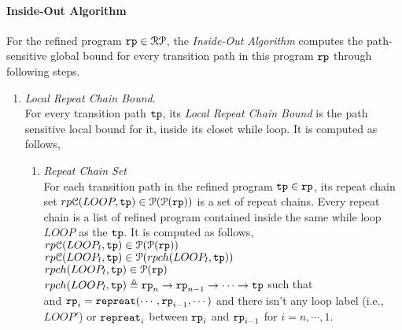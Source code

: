 \paragraph*{Inside-Out Algorithm}
For the refined program $\mathtt{rp} \in \mathcal{RP}$, the \emph{Inside-Out Algorithm}
computes the path-sensitive global bound for every transition path in this program $\mathtt{rp}$ through following steps.

\begin{enumerate}
  \item \emph{Local Repeat Chain Bound}.
  \\
  For every transition path $\mathtt{tp}$, its \emph{Local Repeat Chain Bound} is the 
  path sensitive local bound for it, inside its closet while loop.
  It is computed as follows,
  \begin{enumerate}
\item \emph{Repeat Chain Set}
\\
For each transition path in the refined program $\mathtt{tp} \in \mathtt{rp}$, 
its repeat chain set $rp\mathcal{C}(LOOP, \mathtt{tp}) \in \mathcal{P}(\mathcal{P}(\mathtt{rp}))$
 is a set of repeat chains. 
 Every repeat chain is a list of refined program contained inside the same while loop $LOOP$ as the $\mathtt{tp}$. It is computed as follows,
\\
$rp\mathcal{C}(LOOP_l, \mathtt{tp}) \in \mathcal{P}(\mathcal{P}(\mathtt{rp}))$
\\
 $rp\mathcal{C}(LOOP_l, \mathtt{tp}) \in \mathcal{P}(rpch(LOOP_l, \mathtt{tp}))$
  \\
  $rpch(LOOP_l, \mathtt{tp}) \in \mathcal{P}(\mathtt{rp})$\\
  $rpch(LOOP_l, \mathtt{tp}) \triangleq \mathtt{rp}_n \to \mathtt{rp}_{n-1} \to \cdots \to \mathtt{tp} $
 such that \\
 and
 $\mathtt{rp}_{i}= \mathtt{repreat}(\cdots, \mathtt{rp}_{i - 1}, \cdots)$ and
 there isn't any loop label (i.e., $LOOP'$) or $\mathtt{repreat}_i$ between $\mathtt{rp}_{i}$ and $\mathtt{rp}_{i - 1}$ for $i = n, \cdots, 1$.

\end{enumerate}
\end{enumerate}
